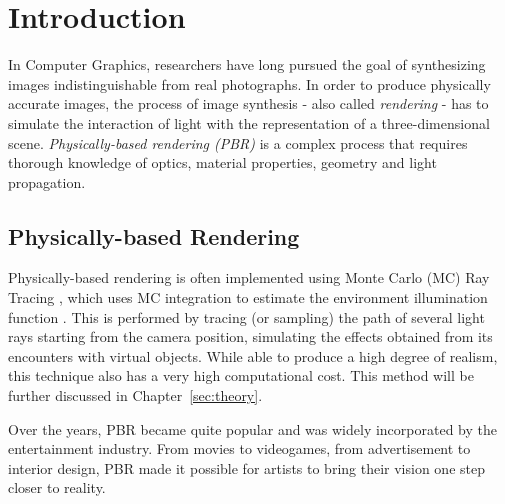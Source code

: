 \chapter{Introduction}
\label{sec:intro}

In Computer Graphics, 
researchers  have long pursued the goal of synthesizing images indistinguishable 
from real photographs. In order to produce physically accurate images, the 
process of image synthesis - also called \textit{rendering} - has to simulate the 
interaction of light with the representation of a three-dimensional scene. 
%
\textit{Physically-based rendering (PBR)} is a complex process that requires 
thorough knowledge of optics, material properties, geometry and light 
propagation.


\section{Physically-based Rendering}
Physically-based rendering is often implemented using Monte Carlo (MC) Ray Tracing \cite{Lafortune96mathematicalmodels}, which uses MC 
integration to estimate the environment illumination function \cite{Keller:2007}. 
This is performed by tracing (or sampling) the path of several light rays starting from the camera position, simulating the effects obtained from its encounters with virtual objects. 
%
While able to produce a high degree of realism, this technique also has a very 
high computational cost. This method will be further discussed in Chapter~\ref{sec:theory}.

Over the years, PBR became quite popular and was widely incorporated by the 
entertainment industry. From movies to videogames, from advertisement to interior 
design, PBR made it possible for artists to bring their 
vision one step closer to reality. 

